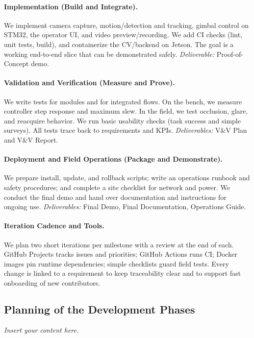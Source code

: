 \documentclass[12pt]{article}
\newcommand{\lips}{\textit{Insert your content here.}}
\begin{document}
\paragraph{Implementation (Build and Integrate).}
We implement camera capture, motion/detection and tracking, gimbal control on STM32, the operator UI, and video preview/recording. We add CI checks (lint, unit tests, build), and containerize the CV/backend on Jetson. The goal is a working end-to-end slice that can be demonstrated safely. \emph{Deliverable:} Proof-of-Concept demo.

\paragraph{Validation and Verification (Measure and Prove).}
We write tests for modules and for integrated flows. On the bench, we measure controller step response and maximum slew. In the field, we test occlusion, glare, and reacquire behavior. We run basic usability checks (task success and simple surveys). All tests trace back to requirements and KPIs. \emph{Deliverables:} V\&V Plan and V\&V Report.

\paragraph{Deployment and Field Operations (Package and Demonstrate).}
We prepare install, update, and rollback scripts; write an operations runbook and safety procedures; and complete a site checklist for network and power. We conduct the final demo and hand over documentation and instructions for ongoing use. \emph{Deliverables:} Final Demo, Final Documentation, Operations Guide.

\paragraph{Iteration Cadence and Tools.}
We plan two short iterations per milestone with a review at the end of each. GitHub Projects tracks issues and priorities; GitHub Actions runs CI; Docker images pin runtime dependencies; simple checklists guard field tests. Every change is linked to a requirement to keep traceability clear and to support fast onboarding of new contributors.






\subsection{Planning of the Development Phases}
\lips
\end{document}
